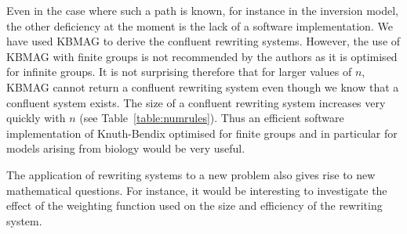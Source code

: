 \documentclass[12pt,a4paper]{amsart}
\numberwithin{equation}{section}
\begin{document}
Even in the case where such a path is known, for instance in the inversion model, the other deficiency at the moment is the lack of a software implementation. We have used KBMAG to derive the confluent rewriting systems. However, the use of KBMAG with finite groups is not recommended by the authors as it is optimised for infinite groups. It is not surprising therefore that for larger values of $n$, KBMAG cannot return a confluent rewriting system even though we know that a confluent system exists. The size of a confluent rewriting system increases very quickly with $n$ (see Table~\ref{table:numrules}). Thus an efficient software implementation of Knuth-Bendix optimised for finite groups and in particular for models arising from biology would be very useful.


The application of rewriting systems to a new problem also gives rise to new mathematical questions. For instance, it would be interesting to investigate the effect of the weighting function used on the size and efficiency of the rewriting system.



\end{document}
